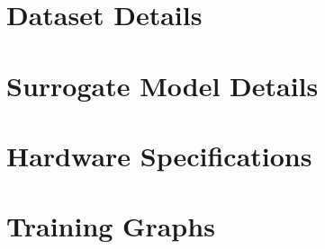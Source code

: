 \documentclass[../main.tex]{subfiles}
\begin{document}
\appendix
\chapter{Dataset Details}\label{appendix:datasets}

\chapter{Surrogate Model Details}

\chapter{Hardware Specifications}

\chapter{Training Graphs}
\end{document}

